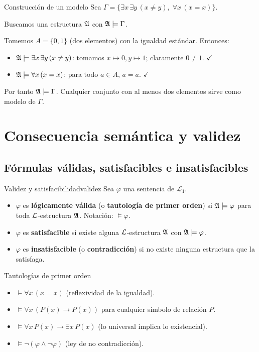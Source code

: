 \begin{ejemplo}{Construcción de un modelo}{}
Sea $\Gamma = \{\exists x\, \exists y\, (x \neq y),\; \forall x\, (x = x)\}$.

Buscamos una estructura $\mathfrak{A}$ con $\mathfrak{A} \models \Gamma$.

Tomemos $A = \{0, 1\}$ (dos elementos) con la igualdad estándar. Entonces:
\begin{itemize}
  \item $\mathfrak{A} \models \exists x\, \exists y\, (x \neq y)$: tomamos $x \mapsto 0, y \mapsto 1$; claramente $0 \neq 1$. $\checkmark$
  \item $\mathfrak{A} \models \forall x\, (x = x)$: para todo $a \in A$, $a = a$. $\checkmark$
\end{itemize}
Por tanto $\mathfrak{A} \models \Gamma$. Cualquier conjunto con al menos dos elementos sirve como modelo de $\Gamma$.
\end{ejemplo}

\section{Consecuencia semántica y validez}

\subsection{Fórmulas válidas, satisfacibles e insatisfacibles}

\begin{definicion}{Validez y satisfacibilidad}{validez}
Sea $\varphi$ una sentencia de $\mathcal{L}_1$.
\begin{itemize}[leftmargin=2em]
  \item $\varphi$ es \textbf{lógicamente válida} (o \textbf{tautología de primer orden}) si $\mathfrak{A} \models \varphi$ para toda $\mathcal{L}$-estructura $\mathfrak{A}$. Notación: $\models \varphi$.
  \item $\varphi$ es \textbf{satisfacible} si existe alguna $\mathcal{L}$-estructura $\mathfrak{A}$ con $\mathfrak{A} \models \varphi$.
  \item $\varphi$ es \textbf{insatisfacible} (o \textbf{contradicción}) si no existe ninguna estructura que la satisfaga.
\end{itemize}
\end{definicion}

\begin{ejemplo}{Tautologías de primer orden}{}
\begin{itemize}
  \item $\models \forall x\, (x = x)$ \quad (reflexividad de la igualdad).
  \item $\models \forall x\, (P(x) \to P(x))$ \quad para cualquier símbolo de relación $P$.
  \item $\models \forall x\, P(x) \to \exists x\, P(x)$ \quad (lo universal implica lo existencial).
  \item $\models \neg(\varphi \wedge \neg\varphi)$ \quad (ley de no contradicción).
\end{itemize}
\end{ejemplo}


